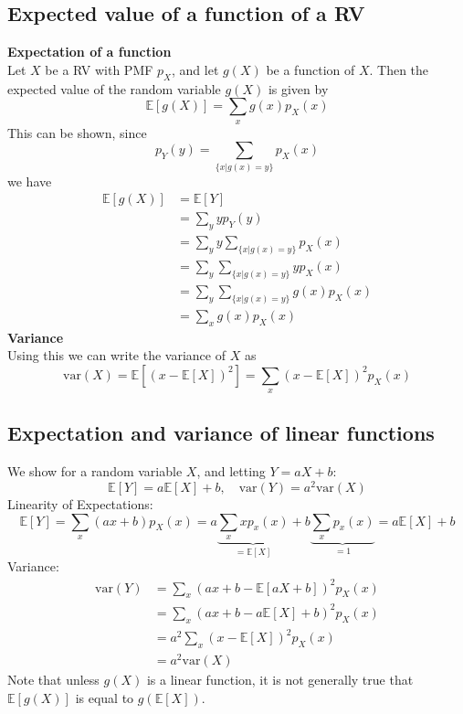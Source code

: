 \documentclass{report}
\begin{document}
\subsection{Expected value of a function of a RV}
\textbf{Expectation of a function}\\
Let $X$ be a RV with PMF $p_X$, and let $g(X)$ be a function of $X$. Then the expected value
of the random variable $g(X)$ is given by
\begin{equation*}
\boxed{\mathbb{E}[g(X)]=\sum_xg(x)p_X(x)}
\end{equation*}
This can be shown, since
\begin{equation*}
p_Y(y)=\sum_{\{x|g(x)=y\}}p_X(x)
\end{equation*}
we have
\begin{align*}
\mathbb{E}[g(X)]&=\mathbb{E}[Y]\\
&=\sum_yyp_Y(y)\\
&=\sum_yy\sum_{\{x|g(x)=y\}}p_X(x)\\
&=\sum_y\sum_{\{x|g(x)=y\}}yp_X(x)\\
&=\sum_y\sum_{\{x|g(x)=y\}}g(x)p_X(x)\\
&=\sum_xg(x)p_X(x)
\end{align*}
\textbf{Variance}\\
Using this we can write the variance of $X$ as
\begin{equation*}
\text{var}(X)=\mathbb{E}\left[(x-\mathbb{E}[X])^2\right]
=\sum_x(x-\mathbb{E}[X])^2p_X(x)
\end{equation*}
\newpage

\subsection{Expectation and variance of linear functions}
We show for a random variable $X$, and letting $Y=aX+b$:
\begin{equation*}
\boxed{\mathbb{E}[Y]=a\mathbb{E}[X]+b,\quad
\text{var}(Y)=a^2\text{var}(X)}
\end{equation*}
Linearity of Expectations:
\begin{equation*}
\mathbb{E}[Y]=\sum_x(ax+b)p_X(x)=a\underbrace{\sum_xxp_x(x)}_{=\mathbb{E}[X]}+b\underbrace{\sum_xp_x(x)}_{=1}
=a\mathbb{E}[X]+b
\end{equation*}
Variance:
\begin{align*}
\text{var}(Y)&=\sum_x(ax+b-\mathbb{E}[aX+b])^2p_X(x)\\
&=\sum_x(ax+b-a\mathbb{E}[X]+b)^2p_X(x)\\
&=a^2\sum_x(x-\mathbb{E}[X])^2p_X(x)\\
&=a^2\text{var}(X)
\end{align*}
Note that unless $g(X)$ is a linear function, it is not generally true that $\mathbb{E}[g(X)]$ is equal to 
$g(\mathbb{E}[X])$.
\end{document}

